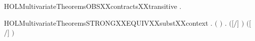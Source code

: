 \newcommand{\HOLMultivariateTheoremsOBSXXcontractsXXsubstXXcontext}{\UseVerbatim{HOLMultivariateTheoremsOBSXXcontractsXXsubstXXcontext}}
\begin{SaveVerbatim}{HOLMultivariateTheoremsOBSXXcontractsXXtransitive}
\HOLTokenTurnstile{} \HOLSymConst{\HOLTokenForall{}}  .
          \HOLSymConst{\HOLTokenConj{}}    \HOLSymConst{\HOLTokenImp{}}
         
\end{SaveVerbatim}
\newcommand{\HOLMultivariateTheoremsOBSXXcontractsXXtransitive}{\UseVerbatim{HOLMultivariateTheoremsOBSXXcontractsXXtransitive}}
\begin{SaveVerbatim}{HOLMultivariateTheoremsSTRONGXXEQUIVXXsubstXXcontext}
\HOLTokenTurnstile{} \HOLSymConst{\HOLTokenForall{}}  .
         \HOLSymConst{\HOLTokenConj{}} \ensuremath{(}  \HOLSymConst{\ensuremath{=}}  \ensuremath{)} \HOLSymConst{\HOLTokenConj{}}
          \HOLSymConst{\HOLTokenImp{}}
       \HOLSymConst{\HOLTokenForall{}}.    \HOLSymConst{\HOLTokenImp{}}  \ensuremath{(}\ensuremath{[}\ensuremath{/}\ensuremath{]} \ensuremath{)} \ensuremath{(}\ensuremath{[}\ensuremath{/}\ensuremath{]} \ensuremath{)}
\end{SaveVerbatim}
\newcommand{\HOLMultivariateTheoremsSTRONGXXEQUIVXXsubstXXcontext}{\UseVerbatim{HOLMultivariateTheoremsSTRONGXXEQUIVXXsubstXXcontext}}
